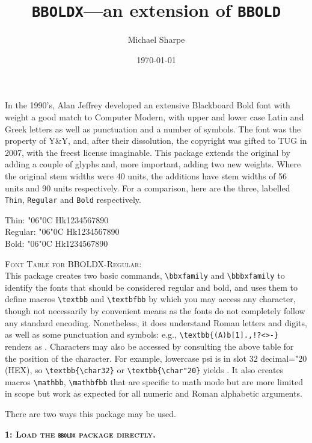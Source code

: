 \documentclass[11pt]{amsart}
\title{{\tt BBOLDX}---an extension of {\tt BBOLD}}
\author{Michael Sharpe}
\date{\today}  %
\begin{document}
\maketitle
In the 1990's, Alan Jeffrey developed an extensive Blackboard Bold font with weight a good match to Computer Modern, with upper and lower case Latin and Greek letters as well as punctuation and a number of symbols. The font was the property of Y\&{}Y, and, after their dissolution, the copyright was gifted to TUG in 2007, with the freest license imaginable. This package extends the original by adding a couple of glyphs and, more important, adding two new weights. Where the original stem widths were 40 units, the additions have stem widths of 56 units and 90 units respectively. For a comparison, here are the three, labelled {\tt Thin}, {\tt Regular} and {\tt Bold} respectively.

Thin: { \char"06\char"0C Hk1234567890}\\
Regular: { \char"06\char"0C Hk1234567890}\\
Bold: { \char"06\char"0C Hk1234567890}

\textsc{Font Table for BBOLDX-Regular}:\\
\newpage
This package creates two basic commands, \verb|\bbxfamily| and \verb|\bbbxfamily| to identify the fonts that should be considered regular and bold, and uses them to define  macros \verb|\textbb| and \verb|\textbfbb| by which you may access any character, though not necessarily by convenient means as the fonts do not completely follow any standard encoding. Nonetheless, it does understand Roman letters and digits, as well as some punctuation and symbols: e.g., \verb|\textbb{(A)b[1].,!?<>-}| renders as . Characters may also be accessed by consulting the above table for the position of the character. For example, lowercase psi is in slot 32 decimal={"20} (HEX), so \verb|\textbb{\char32}| or \verb|\textbb{\char"20}| yields . It also creates macros \verb|\mathbb|, \verb|\mathbfbb| that are specific to math mode but are more limited in scope but work as expected for all numeric and Roman alphabetic arguments.

There are two ways this package may be used.

\textbf{\textsc{1: Load the {\tt bboldx} package directly.}}
\end{document}
